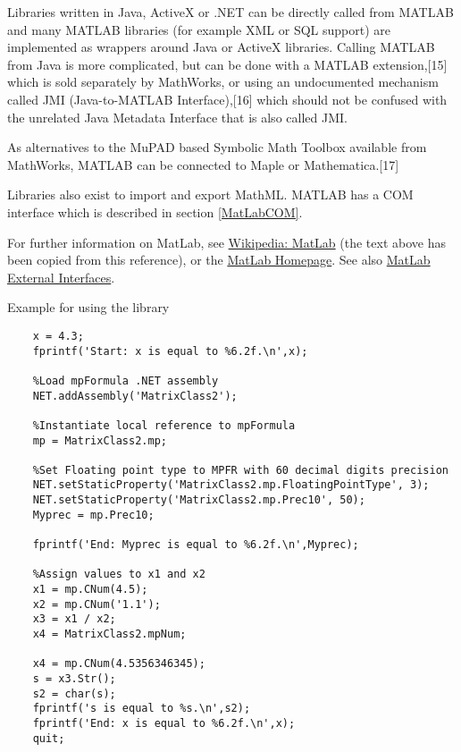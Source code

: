 	\vpara
	Libraries written in Java, ActiveX or .NET can be directly called from MATLAB and many MATLAB libraries (for example XML or SQL support) are implemented as wrappers around Java or ActiveX libraries. Calling MATLAB from Java is more complicated, but can be done with a MATLAB extension,[15] which is sold separately by MathWorks, or using an undocumented mechanism called JMI (Java-to-MATLAB Interface),[16] which should not be confused with the unrelated Java Metadata Interface that is also called JMI.
	
	\vpara
	As alternatives to the MuPAD based Symbolic Math Toolbox available from MathWorks, MATLAB can be connected to Maple or Mathematica.[17]
	
	\vpara
	Libraries also exist to import and export MathML. MATLAB has a COM interface which is described in section \ref{MatLabCOM}.
	
	
	\vpara
	For further information on MatLab, see \href{http://en.wikipedia.org/wiki/MATLAB}{Wikipedia: MatLab} (the text above has been copied from this reference), or the  \href{http://www.mathworks.com/}{MatLab Homepage}. See also \href{http://www.mathworks.co.uk/help/matlab/external-interfaces.html}{MatLab External Interfaces}.	
	
	
	
	\newpage
	Example for using the library
	
	\begin{lstlisting}
	x = 4.3;
	fprintf('Start: x is equal to %6.2f.\n',x);
	
	%Load mpFormula .NET assembly 
	NET.addAssembly('MatrixClass2');
	
	%Instantiate local reference to mpFormula
	mp = MatrixClass2.mp;
	
	%Set Floating point type to MPFR with 60 decimal digits precision
	NET.setStaticProperty('MatrixClass2.mp.FloatingPointType', 3);
	NET.setStaticProperty('MatrixClass2.mp.Prec10', 50);
	Myprec = mp.Prec10;
	
	fprintf('End: Myprec is equal to %6.2f.\n',Myprec);
	
	%Assign values to x1 and x2
	x1 = mp.CNum(4.5);
	x2 = mp.CNum('1.1');
	x3 = x1 / x2;
	x4 = MatrixClass2.mpNum;
	
	x4 = mp.CNum(4.5356346345);
	s = x3.Str();
	s2 = char(s);
	fprintf('s is equal to %s.\n',s2);
	fprintf('End: x is equal to %6.2f.\n',x);
	quit;
	\end{lstlisting}
	





